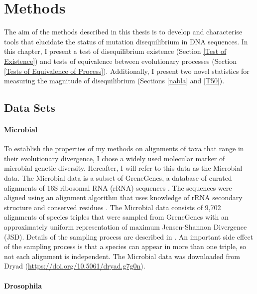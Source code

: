 \chapter{Methods}

The aim of the methods described in this thesis is to develop and characterise tools that elucidate the status of mutation disequilibrium in DNA sequences. In this chapter, I present a test of disequilibrium existence (Section \ref{Test of Existence}) and tests of equivalence between evolutionary processes (Section \ref{Tests of Equivalence of Process}). Additionally, I present two novel statistics for measuring the magnitude of disequilibrium (Sections \ref{nabla} and \ref{T50}). 

\section{Data Sets}

\subsubsection{Microbial}

To establish the properties of my methods on alignments of taxa that range in their evolutionary divergence, I chose a widely used molecular marker of microbial genetic diversity. Hereafter, I will refer to this data as the Microbial data. The Microbial data is a subset of GreneGenes, a database of curated alignments of 16S ribosomal RNA (rRNA) sequences \citep{McDonald2012AnArchaea}. The sequences were aligned using an alignment algorithm that uses knowledge of rRNA secondary structure and conserved residues \citep{McDonald2012AnArchaea}. The Microbial data consists of 9,702 alignments of species triples that were sampled from GreneGenes with an approximately uniform representation of maximum Jensen-Shannon Divergence (JSD). Details of the sampling process are described in \citep{Kaehler2015}. An important side effect of the sampling process is that a species can appear in more than one triple, so not each alignment is independent. The Microbial data was downloaded from Dryad (\href{https://doi.org/10.5061/dryad.g7g0n}{https://doi.org/10.5061/dryad.g7g0n}).  

\subsubsection{Drosophila}

